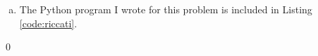 \begin{homeworkProblem}[Problem 5.1]
{\begin{enumerate}[a.]
        \begin{align*}
          x'Px &= x' \left[ R + \beta A'PA - (\beta A'PB + H')(Q + \beta B'PB)^{-1}(\beta B'PA + H) \right]x' \\
            P &= R + \beta A'PA - (\beta A'PB + H')(Q + \beta B'PB)^{-1}(\beta B'PA + H)
        \end{align*} \qed

      \item The Python program I wrote for this problem is included in Listing  \ref{code:riccati}.

    \end{enumerate}

    
    \qed

  }
\end{homeworkProblem}
